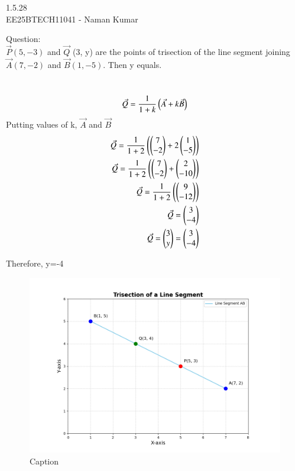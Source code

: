 \documentclass[a4paper, 11pt]{article}
\author{EE25BTECH11041-Naman Kumar }
\begin{document}
\begin{center}
    \huge{1.5.28}\\
    \large{EE25BTECH11041 - Naman Kumar}
\end{center}
Question:\\
$\Vec{P} (5, -3)$ and $\Vec{Q}$ (3, y) are the points of trisection of the line segment joining $\Vec{A} (7, -2)$ and $\Vec{B} (1, -5)$. Then y equals.

\solution \\
\begin{align}
\Vec{Q}=\frac{1}{1+k}\left(\Vec{A}+k\Vec{B}\right)\\
\end{align}
Putting values of k, $\Vec{A}$ and $\Vec{B}$\\
\begin{align}
\Vec{Q}=\frac{1}{1+2}\left(\begin{pmatrix}7\\-2\end{pmatrix}+2\begin{pmatrix}1\\-5\end{pmatrix}\right)\\
\Vec{Q}=\frac{1}{1+2}\left(\begin{pmatrix}7\\-2\end{pmatrix}+\begin{pmatrix}2\\-10\end{pmatrix}\right)\\
\Vec{Q}=\frac{1}{1+2}\left(\begin{pmatrix}9\\-12\end{pmatrix}\right)\\
\Vec{Q}=\begin{pmatrix}3\\-4\end{pmatrix}\\
\Vec{Q}=\begin{pmatrix}3\\y\end{pmatrix}=\begin{pmatrix}3\\-4\end{pmatrix}
\end{align}
\begin{center}
Therefore, y=-4
\end{center}
\newpage
\begin{figure}
    \centering
    \includegraphics[width=\columnwidth]{figs/trisection_plot.png}
    \caption{Caption}
    \label{fig:placeholder}
\end{figure}
\end{document}
